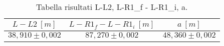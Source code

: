 \begin{table}[H]
    \centering
        \begin{tabular}{|c|c|c|}
        \hline
        $ L-L2~[m] $ & $ L-R1_f - L-R1_i~[m] $ & $ a~[m] $\\
        \hline
        $ 38,910 \pm 0,002 $ & $ 87,270 \pm 0,002 $ & $ 48,360 \pm 0,002 $\\
        \hline
        \end{tabular}
    \caption{Tabella risultati L-L2, L-R1_f - L-R1_i, a.}
\end{table}